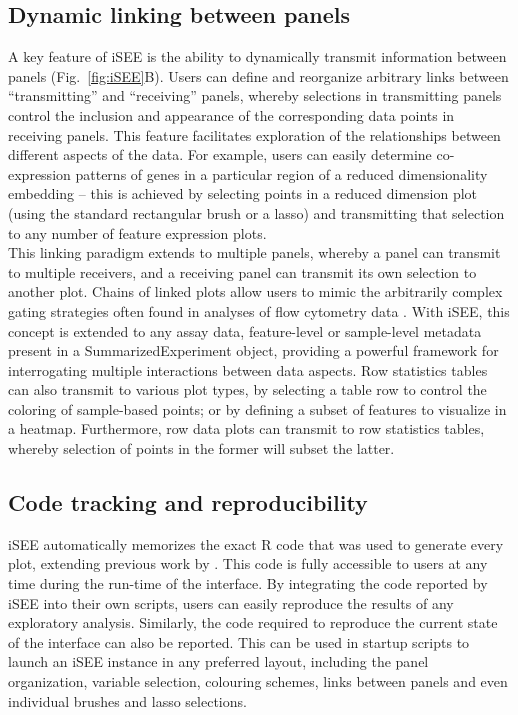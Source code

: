 \documentclass[10pt,a4paper,twocolumn]{article}
\let\cite\citep
\begin{document}
\subsection*{Dynamic linking between panels}
A key feature of iSEE is the ability to dynamically transmit information between panels (Fig.~\ref{fig:iSEE}B).
Users can define and reorganize arbitrary links between ``transmitting'' and ``receiving'' panels, whereby selections in transmitting panels control the inclusion and appearance of the corresponding data points in receiving panels.
This feature facilitates exploration of the relationships between different aspects of the data.
For example, users can easily determine co-expression patterns of genes in a particular region of a reduced dimensionality embedding -- this is achieved by selecting points in a reduced dimension plot (using the standard rectangular brush or a lasso) and transmitting that selection to any number of feature expression plots.\\

This linking paradigm extends to multiple panels, whereby a panel can transmit to multiple receivers, and a receiving panel can transmit its own selection to another plot.
Chains of linked plots allow users to mimic the arbitrarily complex gating strategies often found in analyses of flow cytometry data \citep{finak2014opencyto}.
With iSEE, this concept is extended to any assay data, feature-level or sample-level metadata present in a SummarizedExperiment object, providing a powerful framework for interrogating multiple interactions between data aspects.
Row statistics tables can also transmit to various plot types, by selecting a table row to control the coloring of sample-based points;
or by defining a subset of features to visualize in a heatmap.
Furthermore, row data plots can transmit to row statistics tables, whereby selection of points in the former will subset the latter.

\subsection*{Code tracking and reproducibility}

iSEE automatically memorizes the exact R code that was used to generate every plot, extending previous work by \cite{marini2016interrepro}.
This code is fully accessible to users at any time during the run-time of the interface.
By integrating the code reported by iSEE into their own scripts, users can easily reproduce the results of any exploratory analysis.
Similarly, the code required to reproduce the current state of the interface can also be reported.
This can be used in startup scripts to launch an iSEE instance in any preferred layout, including the panel organization, variable selection, colouring schemes, links between panels and even individual brushes and lasso selections.
\end{document}
